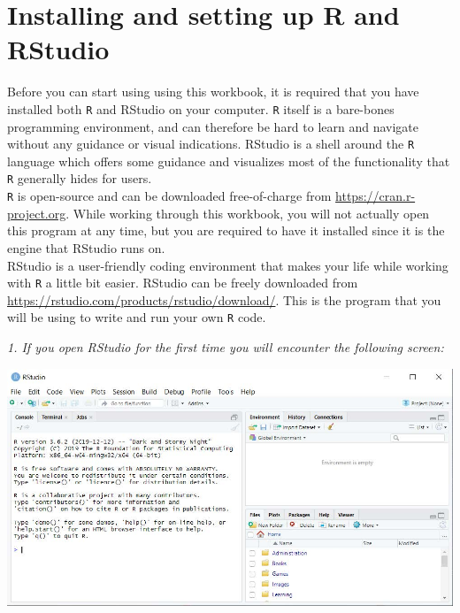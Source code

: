 \thispagestyle{emptyhead}

\section{Installing and setting up R and RStudio}

Before you can start using using this workbook, it is required that you have installed both \texttt{R} and RStudio on your computer. \texttt{R} itself is a bare-bones programming environment, and can therefore be hard to learn and navigate without any guidance or visual indications. RStudio is a shell around the \texttt{R} language which offers some guidance and visualizes most of the functionality that \texttt{R} generally hides for users.\\

\texttt{R} is open-source and can be downloaded free-of-charge from \url{https://cran.r-project.org}. While working through this workbook, you will not actually open this program at any time, but you are required to have it installed since it is the engine that RStudio runs on. \\

RStudio is a user-friendly coding environment that makes your life while working with \texttt{R} a little bit easier. RStudio can be freely downloaded from \url{https://rstudio.com/products/rstudio/download/}. This is the program that you will be using to write and run your own \texttt{R} code. \\

\vspace*{1cm}

\begin{minipage}{0.4\textwidth}
\textit{1. If you open RStudio for the first
time you will encounter the
following screen:}
\end{minipage}%
\hfill%
\begin{minipage}{0.55\textwidth}
\includegraphics[width=\linewidth]{Files/Images/setup1.jpg}
\end{minipage} \\
\\
\bigskip

